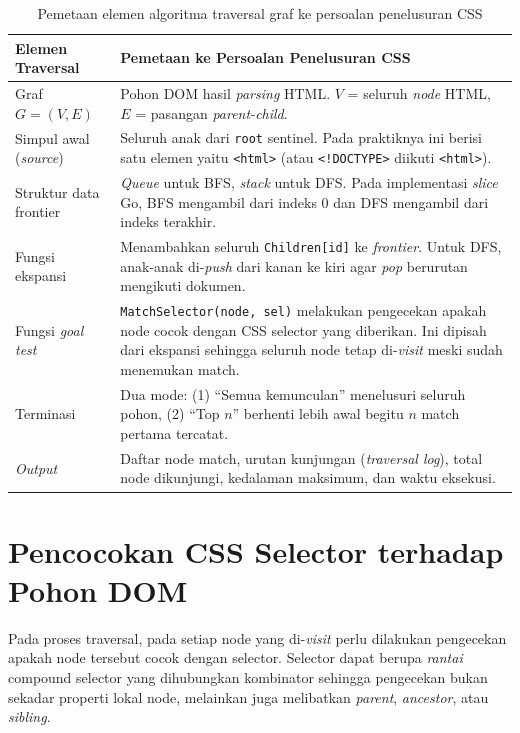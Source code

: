 \begin{table}[H]
\centering
\caption{Pemetaan elemen algoritma traversal graf ke persoalan penelusuran CSS}
\begin{tabularx}{\textwidth}{|l|X|}
\hline
\textbf{Elemen Traversal} & \textbf{Pemetaan ke Persoalan Penelusuran CSS} \\
\hline
Graf $G = (V, E)$ & Pohon DOM hasil \textit{parsing} HTML. $V$ = seluruh \textit{node} HTML, $E$ = pasangan \textit{parent-child}. \\
\hline
Simpul awal (\textit{source}) & Seluruh anak dari \texttt{root} sentinel. Pada praktiknya ini berisi satu elemen yaitu \texttt{<html>} (atau \texttt{<!DOCTYPE>} diikuti \texttt{<html>}). \\
\hline
Struktur data frontier & \textit{Queue} untuk BFS, \textit{stack} untuk DFS. Pada implementasi \textit{slice} Go, BFS mengambil dari indeks 0 dan DFS mengambil dari indeks terakhir. \\
\hline
Fungsi ekspansi & Menambahkan seluruh \texttt{Children[id]} ke \textit{frontier}. Untuk DFS, anak-anak di-\textit{push} dari kanan ke kiri agar \textit{pop} berurutan mengikuti dokumen. \\
\hline
Fungsi \textit{goal test} & \texttt{MatchSelector(node, sel)} melakukan pengecekan apakah node cocok dengan CSS selector yang diberikan. Ini dipisah dari ekspansi sehingga seluruh node tetap di-\textit{visit} meski sudah menemukan match. \\
\hline
Terminasi & Dua mode: (1) ``Semua kemunculan'' menelusuri seluruh pohon, (2) ``Top $n$'' berhenti lebih awal begitu $n$ match pertama tercatat. \\
\hline
\textit{Output} & Daftar node match, urutan kunjungan (\textit{traversal log}), total node dikunjungi, kedalaman maksimum, dan waktu eksekusi. \\
\hline
\end{tabularx}
\end{table}

\section{Pencocokan CSS Selector terhadap Pohon DOM}

Pada proses traversal, pada setiap node yang di-\textit{visit} perlu dilakukan pengecekan apakah node tersebut cocok dengan selector. Selector dapat berupa \textit{rantai} compound selector yang dihubungkan kombinator sehingga pengecekan bukan sekadar properti lokal node, melainkan juga melibatkan \textit{parent}, \textit{ancestor}, atau \textit{sibling}.

